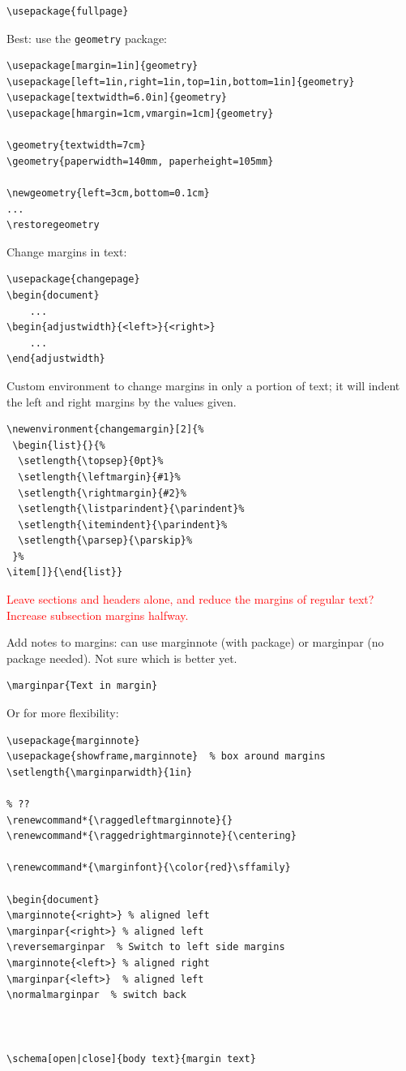 \documentclass{article}
\begin{document}
\begin{lstlisting}
\usepackage{fullpage}
\end{lstlisting}

Best: use the \verb|geometry| package:
\begin{lstlisting}
\usepackage[margin=1in]{geometry}
\usepackage[left=1in,right=1in,top=1in,bottom=1in]{geometry}
\usepackage[textwidth=6.0in]{geometry}
\usepackage[hmargin=1cm,vmargin=1cm]{geometry}

\geometry{textwidth=7cm}
\geometry{paperwidth=140mm, paperheight=105mm}

\newgeometry{left=3cm,bottom=0.1cm}
...
\restoregeometry
\end{lstlisting}


Change margins in text:
\begin{lstlisting}
\usepackage{changepage}
\begin{document}
    ...
\begin{adjustwidth}{<left>}{<right>}
    ...
\end{adjustwidth}
\end{lstlisting}

Custom environment to change margins in only a portion of text;
it will indent the left and right margins by the values given.
\begin{lstlisting}
\newenvironment{changemargin}[2]{%
 \begin{list}{}{%
  \setlength{\topsep}{0pt}%
  \setlength{\leftmargin}{#1}%
  \setlength{\rightmargin}{#2}%
  \setlength{\listparindent}{\parindent}%
  \setlength{\itemindent}{\parindent}%
  \setlength{\parsep}{\parskip}%
 }%
\item[]}{\end{list}}
\end{lstlisting}

\textcolor{red}{Leave sections and headers alone, and reduce the margins of
regular text? Increase subsection margins halfway.}

Add notes to margins: can use marginnote (with package) or marginpar
(no package needed). Not sure which is better yet.
\begin{lstlisting}
\marginpar{Text in margin}
\end{lstlisting}
Or for more flexibility:
\begin{lstlisting}
\usepackage{marginnote}
\usepackage{showframe,marginnote}  % box around margins
\setlength{\marginparwidth}{1in}

% ??
\renewcommand*{\raggedleftmarginnote}{}
\renewcommand*{\raggedrightmarginnote}{\centering}

\renewcommand*{\marginfont}{\color{red}\sffamily}

\begin{document}
\marginnote{<right>} % aligned left
\marginpar{<right>} % aligned left
\reversemarginpar  % Switch to left side margins
\marginnote{<left>} % aligned right
\marginpar{<left>}  % aligned left
\normalmarginpar  % switch back



\schema[open|close]{body text}{margin text}
\end{lstlisting}
\end{document}
